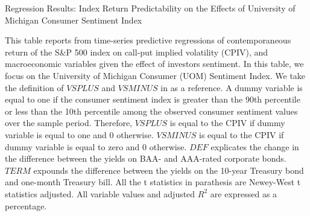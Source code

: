 
\begin{table}[h]

\caption{Regression Results: Index Return Predictability on the Effects of University of Michigan Consumer Sentiment Index}\label{table:UOM_sentiment}
\begin{threeparttable}


\medskip
\begin{spacing}{1.1}
{\footnotesize 
This table reports from time-series predictive regressions of contemporaneous return of the S\&P 500 index on call-put implied volatility (CPIV), and macroeconomic variables given the effect of investors sentiment. In this table, we focus on the University of Michigan Consumer (UOM) Sentiment Index. We take the definition of $VSPLUS$ and $VSMINUS$ in \textcite{atilgan2015implied} as a reference. A dummy variable is equal to one if the consumer sentiment index is greater than the 90th percentile or less than the 10th percentile among the observed consumer sentiment values over the sample period. Therefore, $VSPLUS$ is equal to the CPIV if dummy variable is equal to one and 0 otherwise. $VSMINUS$ is equal to the CPIV if dummy variable is equal to zero and 0 otherwise. $DEF$ explicates the change in the difference between the yields on BAA- and AAA-rated corporate bonds. $TERM$ expounds the difference between the yields on the 10-year Treasury bond and one-month Treasury bill. All the t statistics in parathesis are Newey-West t statistics adjusted. All variable values and adjusted $R^{2}$ are expressed as a percentage.     
}
\end{spacing}
\medskip
\bigskip
\footnotesize


\end{threeparttable}
\end{table}
